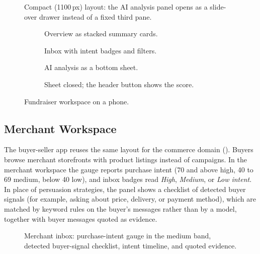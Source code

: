 \begin{figure}[!htbp]
  \centering
  \caption{Compact (1100\,px) layout: the AI analysis panel opens as a slide-over drawer instead of a fixed third pane.}
  \label{fig:ui-compact}
\end{figure}

\begin{figure}[htbp]
  \centering
  \begin{subfigure}[t]{0.235\textwidth}
    \centering
    \caption{Overview as stacked summary cards.}
  \end{subfigure}
  \hfill
  \begin{subfigure}[t]{0.235\textwidth}
    \centering
    \caption{Inbox with intent badges and filters.}
  \end{subfigure}
  \hfill
  \begin{subfigure}[t]{0.235\textwidth}
    \centering
    \caption{AI analysis as a bottom sheet.}
  \end{subfigure}
  \hfill
  \begin{subfigure}[t]{0.235\textwidth}
    \centering
    \caption{Sheet closed; the header button shows the score.}
  \end{subfigure}
  \caption{Fundraiser workspace on a phone.}
  \label{fig:ui-fundraiser-mobile}
\end{figure}

\subsection{Merchant Workspace}
The buyer-seller app reuses the same layout for the commerce domain (). Buyers browse merchant storefronts with product listings instead of campaigns. In the merchant workspace the gauge reports purchase intent (70 and above high, 40 to 69 medium, below 40 low), and inbox badges read \emph{High}, \emph{Medium}, or \emph{Low intent}. In place of persuasion strategies, the panel shows a checklist of detected buyer signals (for example, asking about price, delivery, or payment method), which are matched by keyword rules on the buyer's messages rather than by a model, together with buyer messages quoted as evidence.

\begin{figure}[htbp]
  \centering
  \caption{Merchant inbox: purchase-intent gauge in the medium band, detected buyer-signal checklist, intent timeline, and quoted evidence.}
  \label{fig:ui-merchant}
\end{figure}


